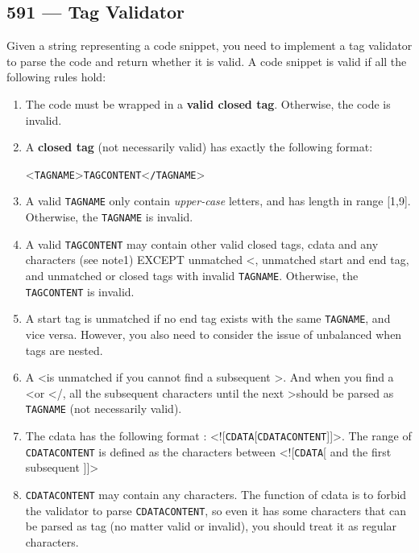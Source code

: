 \documentclass[a4paper,12pt]{article}
\begin{document}
	\subsection{591 --- Tag Validator}
	Given a string representing a code snippet, you need to implement a tag validator to parse the code and return whether it is valid. A code snippet is valid if all the following rules hold:
	\begin{enumerate}
		\item The code must be wrapped in a \textbf{valid closed tag}. Otherwise, the code is invalid.
		\item A \textbf{closed tag} (not necessarily valid) has exactly the following format:
		\par
		\textless \texttt{TAG\textunderscore NAME}\textgreater \texttt{TAG\textunderscore CONTENT}\textless \texttt{/TAG\textunderscore NAME}\textgreater
		\item A valid \texttt{TAG\textunderscore NAME} only contain \textit{upper-case} letters, and has length in range [1,9]. Otherwise, the \texttt{TAG\textunderscore NAME} is invalid.
		\item A valid \texttt{TAG\textunderscore CONTENT} may contain other valid closed tags, cdata and any characters (see note1) EXCEPT unmatched \textless, unmatched start and end tag, and unmatched or closed tags with invalid \texttt{TAG\textunderscore NAME}. Otherwise, the \texttt{TAG\textunderscore CONTENT} is invalid.
		\item A start tag is unmatched if no end tag exists with the same \texttt{TAG\textunderscore NAME}, and vice versa. However, you also need to consider the issue of unbalanced when tags are nested.
		\item A \textless is unmatched if you cannot find a subsequent \textgreater. And when you find a \textless or \textless/, all the subsequent characters until the next \textgreater should be parsed as \texttt{TAG\textunderscore NAME} (not necessarily valid).
		\item The cdata has the following format : \textless![\texttt{CDATA}[\texttt{CDATA\textunderscore CONTENT}]]\textgreater. The range of \texttt{CDATA\textunderscore CONTENT} is defined as the characters between \textless ![\texttt{CDATA}[ and the first subsequent ]]\textgreater
		\item \texttt{CDATA\textunderscore CONTENT} may contain any characters. The function of cdata is to forbid the validator to parse \texttt{CDATA\textunderscore CONTENT}, so even it has some characters that can be parsed as tag (no matter valid or invalid), you should treat it as regular characters.
	\end{enumerate}
\end{document}
